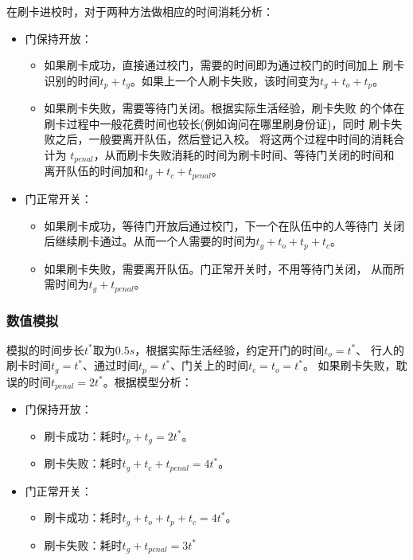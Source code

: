 在刷卡进校时，对于两种方法做相应的时间消耗分析：
\begin{itemize}
    \item 门保持开放：
    \begin{itemize}
        \item 如果刷卡成功，直接通过校门，需要的时间即为通过校门的时间加上
        刷卡识别的时间$t_p+t_g$。如果上一个人刷卡失败，该时间变为$t_g+t_o+t_p$。
        \item 如果刷卡失败，需要等待门关闭。根据实际生活经验，刷卡失败
        的个体在刷卡过程中一般花费时间也较长(例如询问在哪里刷身份证)，同时
        刷卡失败之后，一般要离开队伍，然后登记入校。
        将这两个过程中时间的消耗合计为
        $t_{penal}$，从而刷卡失败消耗的时间为刷卡时间、等待门关闭的时间和
        离开队伍的时间加和$t_g+t_c+t_{penal}$。
    \end{itemize}
    \item 门正常开关：
    \begin{itemize}
        \item 如果刷卡成功，等待门开放后通过校门，下一个在队伍中的人等待门
        关闭后继续刷卡通过。从而一个人需要的时间为$t_g+t_o+t_p+t_c$。
        \item 如果刷卡失败，需要离开队伍。门正常开关时，不用等待门关闭，
        从而所需时间为$t_g+t_{penal}$。
    \end{itemize}
\end{itemize}

\subsubsection{数值模拟}
模拟的时间步长$t^*$取为$0.5s$，根据实际生活经验，约定开门的时间$t_o=t^*$、
行人的刷卡时间$t_g=t^*$、通过时间$t_p=t^*$、门关上的时间$t_c=t_o=t^*$。
如果刷卡失败，耽误的时间$t_{penal}=2t^*$。根据模型分析：
\begin{itemize}
    \item 门保持开放：
    \begin{itemize}
        \item 刷卡成功：耗时$t_p+t_g=2t^*$。
        \item 刷卡失败：耗时$t_g+t_c+t_{penal}=4t^*$。
    \end{itemize}
    \item 门正常开关：
    \begin{itemize}
        \item 刷卡成功：耗时$t_g+t_o+t_p+t_c=4t^*$。
        \item 刷卡失败：耗时$t_g+t_{penal}=3t^*$
    \end{itemize}
\end{itemize}


